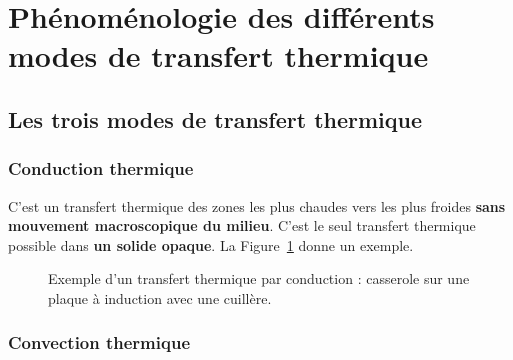 \section[Modes de transfert thermique]{Phénoménologie des différents modes de transfert thermique}

    \subsection{Les trois modes de transfert thermique}

        \subsubsection{Conduction thermique}

            C'est un transfert thermique des zones les plus chaudes vers les plus froides \textbf{sans mouvement macroscopique du milieu}. C'est le seul transfert thermique possible dans \textbf{un solide opaque}. La Figure~\ref{fig:exemple_transfert_thermique_conduction} donne un exemple.

            \begin{figure}[!h]
                \centering
                \caption[Exemple d'un transfert thermique par conduction.]{Exemple d'un transfert thermique par conduction : casserole sur une plaque à induction avec une cuillère.}
                \label{fig:exemple_transfert_thermique_conduction}
            \end{figure}

        \subsubsection{Convection thermique}

